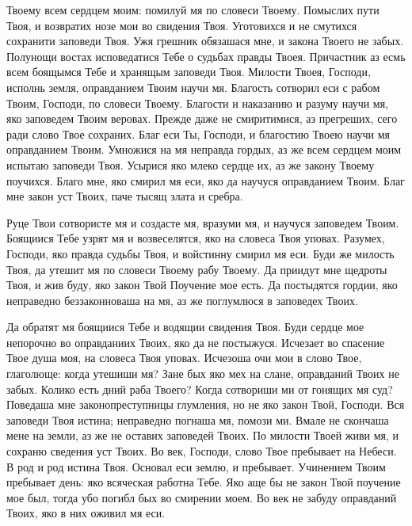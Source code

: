\begin{mymulticols}
Твоему всем сердцем моим: помилуй мя по словеси Твоему. Помыслих пути Твоя, и возвратих нозе мои во свидения Твоя. Уготовихся и не смутихся сохранити заповеди Твоя. Ужя грешник обязашася мне, и закона Твоего не забых. Полунощи востах исповедатися Тебе о судьбах правды Твоея. Причастник аз есмь всем боящымся Тебе и хранящым заповеди Твоя. Милости Твоея, Господи, исполнь земля, оправданием Твоим научи мя. Благость сотворил еси с рабом Твоим, Господи, по словеси Твоему. Благости и наказанию и разуму научи мя, яко заповедем Твоим веровах. Прежде даже не смиритимися, аз прегреших, сего ради слово Твое сохраних. Благ еси Ты, Господи, и благостию Твоею научи мя оправданием Твоим. Умножися на мя неправда гордых, аз же всем сердцем моим испытаю заповеди Твоя. Усырися яко млеко сердце их, аз же закону Твоему поучихся. Благо мне, яко смирил мя еси, яко да научуся оправданием Твоим. Благ мне закон уст Твоих, паче тысящ злата и сребра. 

\pominalnayaslava

Руце Твои сотвористе мя и создасте мя, вразуми мя, и научуся заповедем Твоим. Боящиися Тебе узрят мя и возвеселятся, яко на словеса Твоя уповах. Разумех, Господи, яко правда судьбы Твоя, и войстинну смирил мя еси. Буди же милость Твоя, да утешит мя по словеси Твоему рабу Твоему. Да приидут мне щедроты Твоя, и жив буду, яко закон Твой Поучение мое есть. Да постыдятся гордии, яко неправедно беззаконноваша на мя, аз же поглумлюся в заповедех Твоих. 

Да обратят мя боящиися Тебе и водящии свидения Твоя. Буди сердце мое непорочно во оправданиих Твоих, яко да не постыжуся. Исчезает во спасение Твое душа моя, на словеса Твоя уповах. Исчезоша очи мои в слово Твое, глаголюще: когда утешиши мя? Зане бых яко мех на слане, оправданий Твоих не забых. Колико есть дний раба Твоего? Когда сотвориши ми от гонящих мя суд? Поведаша мне законопреступницы глумления, но не яко закон Твой, Господи. Вся заповеди Твоя истина; неправедно погнаша мя, помози ми. Вмале не скончаша мене на земли, аз же не оставих заповедей Твоих. По милости Твоей живи мя, и сохраню сведения уст Твоих. Во век, Господи, слово Твое пребывает на Небеси. В род и род истина Твоя. Основал еси землю, и пребывает. Учинением Твоим пребывает день: яко всяческая работна Тебе. Яко аще бы не закон Твой поучение мое был, тогда убо погибл бых во смирении моем. Во век не забуду оправданий Твоих, яко в них оживил мя еси. 

\pominalnayaslava


\end{mymulticols}
